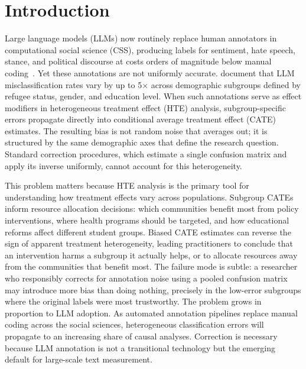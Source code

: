 \section{Introduction}
\label{sec:intro}

Large language models (LLMs) now routinely replace human annotators in computational social science (CSS), producing labels for sentiment, hate speech, stance, and political discourse at costs orders of magnitude below manual coding~\cite{gilardi2023chatgpt,tornberg2024chatgpt,ziems2024nlp}.
Yet these annotations are not uniformly accurate.
\citet{ashwin2025bias} document that LLM misclassification rates vary by up to 5$\times$ across demographic subgroups defined by refugee status, gender, and education level.
When such annotations serve as effect modifiers in heterogeneous treatment effect (HTE) analysis, subgroup-specific errors propagate directly into conditional average treatment effect (CATE) estimates.
The resulting bias is not random noise that averages out; it is structured by the same demographic axes that define the research question.
Standard correction procedures, which estimate a single confusion matrix and apply its inverse uniformly, cannot account for this heterogeneity.

This problem matters because HTE analysis is the primary tool for understanding how treatment effects vary across populations.
Subgroup CATEs inform resource allocation decisions: which communities benefit most from policy interventions, where health programs should be targeted, and how educational reforms affect different student groups.
Biased CATE estimates can reverse the sign of apparent treatment heterogeneity, leading practitioners to conclude that an intervention harms a subgroup it actually helps, or to allocate resources away from the communities that benefit most.
The failure mode is subtle: a researcher who responsibly corrects for annotation noise using a pooled confusion matrix may introduce more bias than doing nothing, precisely in the low-error subgroups where the original labels were most trustworthy.
The problem grows in proportion to LLM adoption.
As automated annotation pipelines replace manual coding across the social sciences, heterogeneous classification errors will propagate to an increasing share of causal analyses.
Correction is necessary because LLM annotation is not a transitional technology but the emerging default for large-scale text measurement.

